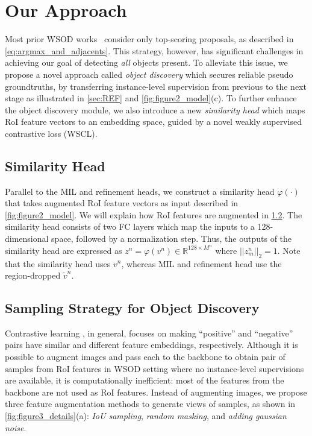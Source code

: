 \documentclass[runningheads]{llncs}
\begin{document}
\section{Our Approach}
\label{sec:approach}
Most prior WSOD works~\cite{Tang_2017_CVPR,huang2020comprehensive} consider only top-scoring proposals, as described in \eqref{eq:argmax_and_adjacents}.
This strategy, however, has significant challenges in achieving our goal of detecting \emph{all} objects present.
To alleviate this issue, we propose a novel approach called \textit{object discovery} which secures reliable pseudo groundtruths, by transferring instance-level supervision from previous to the next stage as illustrated in \cref{sec:REF} and \cref{fig:figure2_model}(c).
To further enhance the object discovery module, we also introduce a new \textit{similarity head} which maps RoI feature vectors to an embedding space, guided by a novel weakly supervised contrastive loss (WSCL).




\subsection{Similarity Head}
Parallel to the MIL and refinement heads, we construct a similarity head $\varphi{(\cdot)}$ that takes augmented RoI feature vectors as input described in \cref{fig:figure2_model}.
We will explain how RoI features are augmented in \cref{sec:sampling_strategy}.
The similarity head consists of two FC layers which map the inputs to a 128-dimensional space, followed by a normalization step.
Thus, the outputs of the similarity head are expressed as $z^n = \varphi{(v^n)} \in\mathbb{R}^{128 \times M^n}$ where $||z^n_m||_2 = 1$.
Note that the similarity head uses $v^n$, whereas MIL and refinement head use the region-dropped $\tilde{v}^n$.

\subsection{Sampling Strategy for Object Discovery}
\label{sec:sampling_strategy}


Contrastive learning \cite{khosla2020supervised,chen2020simple}, in general, focuses on making ``positive'' and ``negative'' pairs have similar and different feature embeddings, respectively.
Although it is possible to augment images and pass each to the backbone to obtain pair of samples from RoI features in WSOD setting where no instance-level supervisions are available, it is computationally inefficient: most of the features from the backbone are not used as RoI features. 
Instead of augmenting images, we propose three feature augmentation methods to generate views of samples, as shown in
\cref{fig:figure3_details}(a):
\textit{IoU sampling}, \textit{random masking}, and \textit{adding gaussian noise}.
\end{document}

